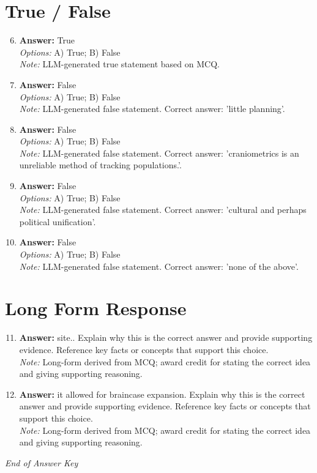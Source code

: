 \documentclass[12pt]{article}
\begin{document}
\section*{True / False}
\begin{enumerate}[label=\arabic*.]
\setcounter{enumi}{5}
\item \textbf{Answer:} True
\\ \textit{Options:} A) True; B) False
\\ \textit{Note:} LLM-generated true statement based on MCQ.
\item \textbf{Answer:} False
\\ \textit{Options:} A) True; B) False
\\ \textit{Note:} LLM-generated false statement. Correct answer: 'little planning'.
\item \textbf{Answer:} False
\\ \textit{Options:} A) True; B) False
\\ \textit{Note:} LLM-generated false statement. Correct answer: 'craniometrics is an unreliable method of tracking populations.'.
\item \textbf{Answer:} False
\\ \textit{Options:} A) True; B) False
\\ \textit{Note:} LLM-generated false statement. Correct answer: 'cultural and perhaps political unification'.
\item \textbf{Answer:} False
\\ \textit{Options:} A) True; B) False
\\ \textit{Note:} LLM-generated false statement. Correct answer: 'none of the above'.
\end{enumerate}

\section*{Long Form Response}
\begin{enumerate}[label=\arabic*.]
\setcounter{enumi}{10}
\item \textbf{Answer:} site.. Explain why this is the correct answer and provide supporting evidence. Reference
key facts or concepts that support this choice.
\\ \textit{Note:} Long-form derived from MCQ; award credit for stating the correct idea and giving supporting reasoning.
\item \textbf{Answer:} it allowed for braincase expansion. Explain why this is the correct answer and provide
supporting evidence. Reference key facts or concepts that support this choice.
\\ \textit{Note:} Long-form derived from MCQ; award credit for stating the correct idea and giving supporting reasoning.
\end{enumerate}

\vfill
\noindent\textit{End of Answer Key}
\end{document}
